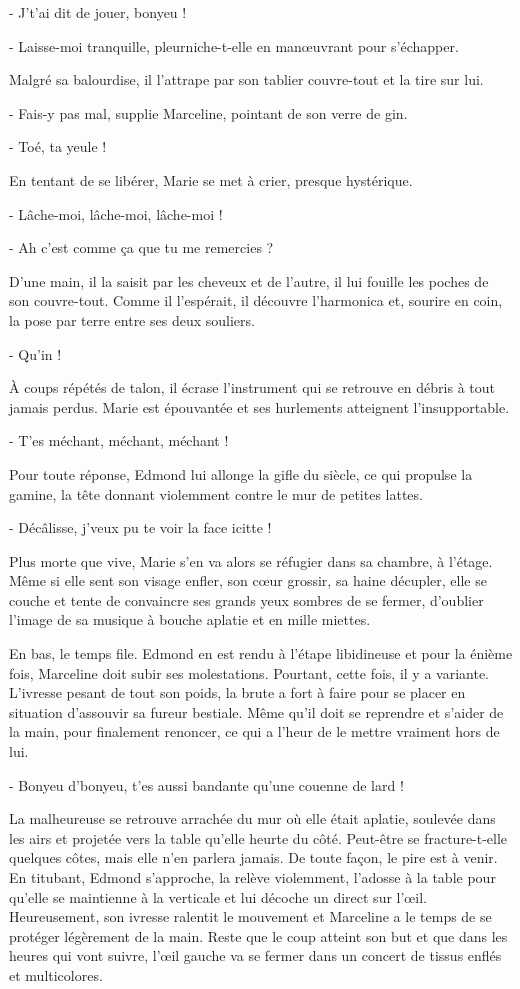 - J’t’ai dit de jouer, bonyeu !

- Laisse-moi tranquille, pleurniche-t-elle en manœuvrant pour s’échapper.

Malgré sa balourdise, il l’attrape par son tablier couvre-tout et la tire sur lui.

- Fais-y pas mal, supplie Marceline, pointant de son verre de gin.

- Toé, ta yeule !

En tentant de se libérer, Marie se met à crier, presque hystérique.

- Lâche-moi, lâche-moi, lâche-moi !

- Ah c’est comme ça que tu me remercies ?

D’une main, il la saisit par les cheveux et de l’autre, il lui fouille les poches de son couvre-tout. Comme il l’espérait, il découvre l’harmonica et, sourire en coin, la pose par terre entre ses deux souliers.

- Qu’in !

À coups répétés de talon, il écrase l’instrument qui se retrouve en débris à tout jamais perdus. Marie est épouvantée et ses hurlements atteignent l’insupportable.

- T’es méchant, méchant, méchant !

Pour toute réponse, Edmond lui allonge la gifle du siècle, ce qui propulse la gamine, la tête donnant violemment contre le mur de petites lattes.

- Décâlisse, j’veux pu te voir la face icitte !

Plus morte que vive, Marie s’en va alors se réfugier dans sa chambre, à l’étage. Même si elle sent son visage enfler, son cœur grossir, sa haine décupler, elle se couche et tente de convaincre ses grands yeux sombres de se fermer, d’oublier l’image de sa musique à bouche aplatie et en mille miettes.

En bas, le temps file. Edmond en est rendu à l’étape libidineuse et pour la énième fois, Marceline doit subir ses molestations. Pourtant, cette fois, il y a variante. L’ivresse pesant de tout son poids, la brute a fort à faire pour se placer en situation d’assouvir sa fureur bestiale. Même qu’il doit se reprendre et s’aider de la main, pour finalement renoncer, ce qui a l’heur de le mettre vraiment hors de lui.

- Bonyeu d’bonyeu, t’es aussi bandante qu’une couenne de lard !

La malheureuse se retrouve arrachée du mur où elle était aplatie, soulevée dans les airs et projetée vers la table qu’elle heurte du côté. Peut-être se fracture-t-elle quelques côtes, mais elle n’en parlera jamais. De toute façon, le pire est à venir. En titubant, Edmond s’approche, la relève violemment, l’adosse à la table pour qu’elle se maintienne à la verticale et lui décoche un direct sur l’œil. Heureusement, son ivresse ralentit le mouvement et Marceline a le temps de se protéger légèrement de la main. Reste que le coup atteint son but et que dans les heures qui vont suivre, l’œil gauche va se fermer dans un concert de tissus enflés et multicolores.

